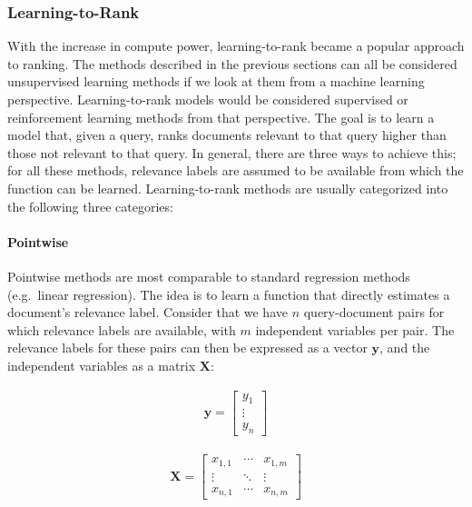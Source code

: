 \subsubsection{Learning-to-Rank}
With the increase in compute power, learning-to-rank became a popular approach to ranking. The methods described in the previous sections can all be considered unsupervised learning methods if we look at them from a machine learning perspective. Learning-to-rank models would be considered supervised or reinforcement learning methods from that perspective. The goal is to learn a model that, given a query, ranks documents relevant to that query higher than those not relevant to that query. In general, there are three ways to achieve this; for all these methods, relevance labels are assumed to be available from which the function can be learned. Learning-to-rank methods are usually categorized into the following three categories: 

\paragraph{Pointwise} Pointwise methods are most comparable to standard regression methods (e.g.\ linear regression). The idea is to learn a function that directly estimates a document's relevance label. Consider that we have $n$ query-document pairs for which relevance labels are available, with $m$ independent variables per pair. The relevance labels for these pairs can then be expressed as a vector $\mathbf{y}$, and the independent variables as a matrix $\mathbf{X}$:

\noindent\begin{minipage}[b]{.45\linewidth}
	\begin{align}
		\mathbf{y} = 
		\begin{bmatrix}
			y_1 \\
			\vdots \\
			y_n
		\end{bmatrix}
	\end{align}
\end{minipage}
\begin{minipage}[b]{.45\linewidth}
	\begin{align}
		\mathbf{X} = 
		\begin{bmatrix}
			x_{1,1} & \cdots & x_{1, m} \\
			\vdots &  \ddots & \vdots \\
			x_{n,1} & \cdots & x_{n, m} 
		\end{bmatrix}
	\end{align}
\end{minipage}


